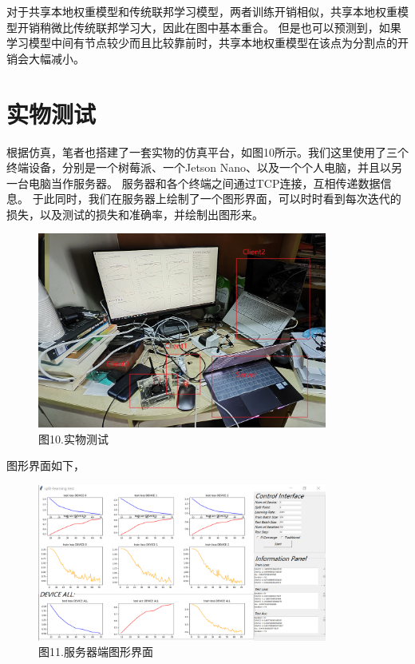 \documentclass{article}
\begin{document}
对于共享本地权重模型和传统联邦学习模型，两者训练开销相似，共享本地权重模型开销稍微比传统联邦学习大，因此在图中基本重合。
但是也可以预测到，如果学习模型中间有节点较少而且比较靠前时，共享本地权重模型在该点为分割点的开销会大幅减小。

\section{实物测试}

根据仿真，笔者也搭建了一套实物的仿真平台，如图10所示。我们这里使用了三个终端设备，分别是一个树莓派、一个Jetson Nano、以及一个个人电脑，并且以另一台电脑当作服务器。
服务器和各个终端之间通过TCP连接，互相传递数据信息。
于此同时，我们在服务器上绘制了一个图形界面，可以时时看到每次迭代的损失，以及测试的损失和准确率，并绘制出图形来。

\begin{figure}[H]
    \centering
    \includegraphics[width=0.85\textwidth]{./figure/5.jpg}  
    \caption*{图10.实物测试}
\end{figure}

图形界面如下，
\begin{figure}[H]
    \centering
    \includegraphics[width=0.85\textwidth]{./figure/6.png}  
    \caption*{图11.服务器端图形界面}
\end{figure}
\end{document}
